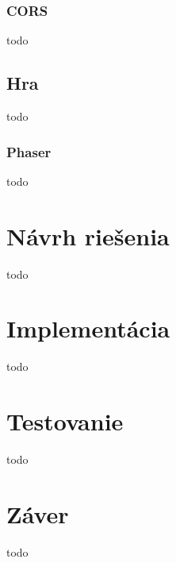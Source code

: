 \subsection{CORS}
todo

\section{Hra}
todo

\subsection{Phaser}
todo

\chapter{Návrh riešenia}
todo

\chapter{Implementácia}
todo

\chapter{Testovanie}
todo

\chapter{Záver}
todo












